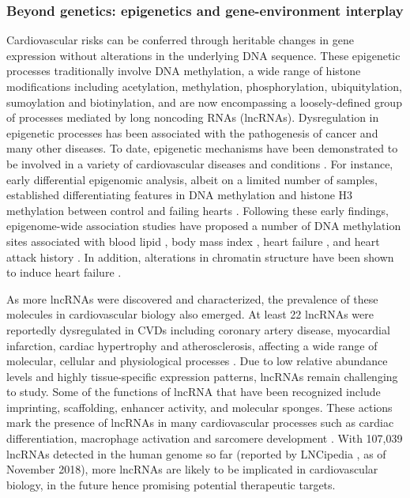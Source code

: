 \documentclass[letter]{bioinfo}
\begin{document}
\subsubsection*{Beyond genetics: epigenetics and gene-environment interplay}	
	Cardiovascular risks can be conferred through heritable changes in gene expression without alterations in the underlying DNA sequence.  These epigenetic processes traditionally involve DNA methylation, a wide range of histone modifications including acetylation, methylation, phosphorylation, ubiquitylation, sumoylation and biotinylation, and are now encompassing a loosely-defined group of processes mediated by long noncoding RNAs (lncRNAs). Dysregulation in epigenetic processes has been associated with the pathogenesis of cancer and many other diseases. To date, epigenetic mechanisms have been demonstrated to be involved in a variety of cardiovascular diseases and conditions \citep{Udali:2013:Cardiovascular,AbiKhalil:2014:emerging,Muka:2016:role,Gidlof:2016:Ischemic}.
	For instance, early differential epigenomic analysis, albeit on a limited number of samples, established differentiating features in DNA methylation and histone H3 methylation between control and failing hearts \citep{Movassagh:2011:Distinct}. Following these early findings, epigenome-wide association studies have proposed a number of DNA methylation sites associated with blood lipid \citep{Irvin:2014:Epigenomewide}, body mass index \citep{Dick:2014:DNA, Wahl:2017:Epigenomewide}, heart failure \citep{Meder:2017:EpigenomeWide}, and heart attack history \citep{Rask-Andersen:2016:Epigenomewide}. In addition, alterations in chromatin structure have been shown to induce heart failure \citep{Rosa-Garrido:2017:HighResolution}.  
	
	As more lncRNAs were discovered and characterized, the prevalence of these molecules in cardiovascular biology also emerged.
	At least 22 lncRNAs were reportedly dysregulated in CVDs including coronary artery disease, myocardial infarction, cardiac hypertrophy and atherosclerosis, affecting a wide range of molecular, cellular and physiological processes \citep{Das:2018:Deciphering, Xu:2018:Targeting}. Due to low relative abundance levels and highly tissue-specific expression patterns, lncRNAs remain challenging to study.
	Some of the functions of lncRNA that have been recognized include imprinting, scaffolding, enhancer activity, and molecular sponges. These actions mark the presence of lncRNAs in many cardiovascular processes such as cardiac differentiation, macrophage activation and sarcomere development \citep{Sallam:2018:Long}. With 107,039 lncRNAs detected in the human genome so far (reported by LNCipedia \citep{Volders:2018:LNCipedia}, as of November 2018), more lncRNAs are likely to be implicated in cardiovascular biology, in the future hence promising potential therapeutic targets.
\end{document}
